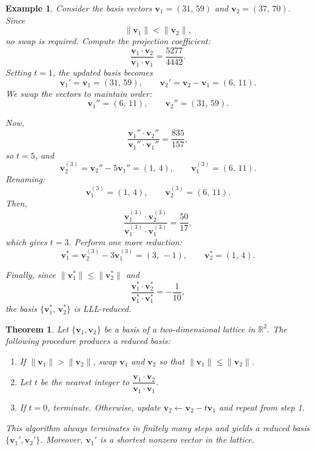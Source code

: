 \documentclass[a4paper,12pt]{article}
\newtheorem{theorem}{Theorem}
\newtheorem*{example}{Example}
\begin{document}
\begin{example}
	

Consider the basis vectors $\bm{v}_1 = (31,\,59)$ and $\bm{v}_2 = (37,\,70)$. Since
\[
\|\bm{v}_1\| < \|\bm{v}_2\|,
\]
no swap is required. Compute the projection coefficient:
\[
\frac{\bm{v}_1 \cdot \bm{v}_2}{\bm{v}_1 \cdot \bm{v}_1} = \frac{5277}{4442}.
\]
Setting $t = 1$, the updated basis becomes
\[
\bm{v}_1' = \bm{v}_1 = (31,\,59), \qquad \bm{v}_2' = \bm{v}_2 - \bm{v}_1 = (6,\,11).
\]
We swap the vectors to maintain order:
\[
\bm{v}_1'' = (6,\,11), \qquad \bm{v}_2'' = (31,\,59).
\]

Now,
\[
\frac{\bm{v}_1'' \cdot \bm{v}_2''}{\bm{v}_1'' \cdot \bm{v}_1''} = \frac{835}{157},
\]
so $t = 5$, and
\[
\bm{v}_2^{(3)} = \bm{v}_2'' - 5\bm{v}_1'' = (1,\,4), \qquad \bm{v}_1^{(3)} = (6,\,11).
\]
Renaming:
\[
\bm{v}_1^{(3)} = (1,\,4), \qquad \bm{v}_2^{(3)} = (6,\,11).
\]
Then,
\[
\frac{\bm{v}_1^{(3)} \cdot \bm{v}_2^{(3)}}{\bm{v}_1^{(3)} \cdot \bm{v}_1^{(3)}} = \frac{50}{17},
\]
which gives $t = 3$. Perform one more reduction:
\[
\bm{v}_1^* = \bm{v}_2^{(3)} - 3\bm{v}_1^{(3)} = (3,\,-1), \qquad \bm{v}_2^* = (1,\,4).
\]

Finally, since $\|\bm{v}_1^*\| \leq \|\bm{v}_2^*\|$ and
\[
\frac{\bm{v}_1^* \cdot \bm{v}_2^*}{\bm{v}_1^* \cdot \bm{v}_1^*} = -\frac{1}{10},
\]
the basis $\{\bm{v}_1^*,\,\bm{v}_2^*\}$ is LLL-reduced.


\end{example}



\begin{theorem}
Let $\{\bm{v}_1, \bm{v}_2\}$ be a basis of a two-dimensional lattice in $\mathbb{R}^2$.  
The following procedure produces a reduced basis:

\begin{enumerate}
    \item If $\|\bm{v}_1\| > \|\bm{v}_2\|$, swap $\bm{v}_1$ and $\bm{v}_2$ so that $\|\bm{v}_1\| \le \|\bm{v}_2\|$.
    \item Let $t$ be the nearest integer to $\dfrac{\bm{v}_1 \cdot \bm{v}_2}{\bm{v}_1 \cdot \bm{v}_1}$.
    \item If $t = 0$, terminate. Otherwise, update $\bm{v}_2 \leftarrow \bm{v}_2 - t\bm{v}_1$ and repeat from step 1.
\end{enumerate}

This algorithm always terminates in finitely many steps and yields a reduced basis $\{\bm{v}_1', \bm{v}_2'\}$.  
Moreover, $\bm{v}_1'$ is a shortest nonzero vector in the lattice.

\end{theorem}
\vspace{1em}
\end{document}
